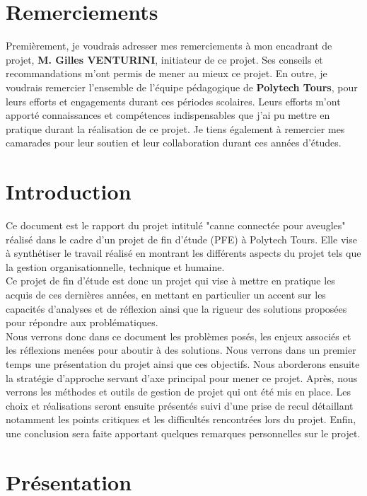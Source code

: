 \documentclass[UTF8]{EPURapport}
\begin{document}
\chapter{Remerciements}

Premièrement, je voudrais adresser mes remerciements à mon encadrant de projet, \textbf{M. Gilles VENTURINI}, initiateur de ce projet. Ses conseils et recommandations m'ont permis de mener au mieux ce projet. En outre, je voudrais remercier l'ensemble de l'équipe pédagogique de \textbf{Polytech Tours}, pour leurs efforts et engagements durant ces périodes scolaires. Leurs efforts m'ont apporté connaissances et compétences indispensables que j'ai pu mettre en pratique durant la réalisation de ce projet. Je tiens également à remercier mes camarades pour leur soutien et leur collaboration durant ces années d'études. 

\chapter{Introduction}
Ce document est le rapport du projet intitulé "canne connectée pour aveugles" réalisé dans le cadre d'un projet de fin d'étude (PFE) à Polytech Tours. Elle vise à synthétiser le travail réalisé en montrant les différents aspects du projet tels que la gestion organisationnelle, technique et humaine.\\

Ce projet de fin d'étude est donc un projet qui vise à mettre en pratique les acquis de ces dernières années, en mettant en particulier un accent sur les capacités d'analyses et de réflexion ainsi que la rigueur des solutions proposées pour répondre aux problématiques.\\

Nous verrons donc dans ce document les problèmes posés, les enjeux associés et les réflexions menées pour aboutir à des solutions. Nous verrons dans un premier temps une présentation du projet ainsi que ces objectifs. Nous aborderons ensuite la stratégie d'approche servant d'axe principal pour mener ce projet. Après, nous verrons les méthodes et outils de gestion de projet qui ont été mis en place. Les choix et réalisations seront ensuite présentés suivi d'une prise de recul détaillant notamment les points critiques et les difficultés rencontrées lors du projet. Enfin, une conclusion sera faite apportant quelques remarques personnelles sur le projet.

\chapter{Présentation}
\end{document}
